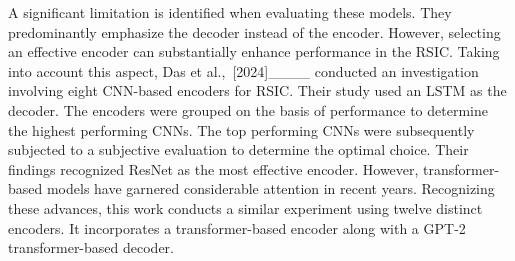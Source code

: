 A significant limitation is identified when evaluating these models. They predominantly emphasize the decoder instead of the encoder. However, selecting an effective encoder can substantially enhance performance in the RSIC. Taking into account this aspect, Das et al.,~[2024]____ conducted an investigation involving eight CNN-based encoders for RSIC. Their study used an LSTM as the decoder. The encoders were grouped on the basis of performance to determine the highest performing CNNs. The top performing CNNs were subsequently subjected to a subjective evaluation to determine the optimal choice. Their findings recognized ResNet as the most effective encoder. However, transformer-based models have garnered considerable attention in recent years. Recognizing these advances, this work conducts a similar experiment using twelve distinct encoders. It incorporates a transformer-based encoder along with a GPT-2 transformer-based decoder.